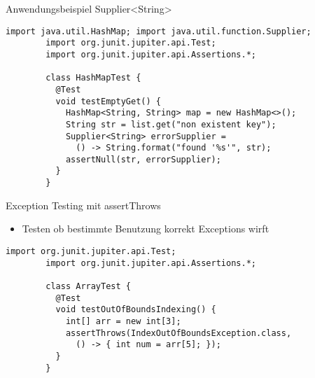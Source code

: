 \documentclass[utf8,t,aspectratio=169]{beamer}
\begin{document}
    \begin{frame}[fragile]{Anwendungsbeispiel Supplier<String>}
      \begin{lstlisting}[gobble=8]
        import java.util.HashMap; import java.util.function.Supplier;
        import org.junit.jupiter.api.Test;
        import org.junit.jupiter.api.Assertions.*;

        class HashMapTest {
          @Test
          void testEmptyGet() {
            HashMap<String, String> map = new HashMap<>();
            String str = list.get("non existent key");
            Supplier<String> errorSupplier =
              () -> String.format("found '%s'", str);
            assertNull(str, errorSupplier);
          }
        }
      \end{lstlisting}
    \end{frame}
    \begin{frame}[fragile]{Exception Testing mit assertThrows}
      \begin{itemize}
        \item Testen ob bestimmte Benutzung korrekt Exceptions wirft
      \end{itemize}
      \begin{lstlisting}[gobble=8]
        import org.junit.jupiter.api.Test;
        import org.junit.jupiter.api.Assertions.*;

        class ArrayTest {
          @Test
          void testOutOfBoundsIndexing() {
            int[] arr = new int[3];
            assertThrows(IndexOutOfBoundsException.class,
              () -> { int num = arr[5]; });
          }
        }
      \end{lstlisting}
    \end{frame}
\end{document}
